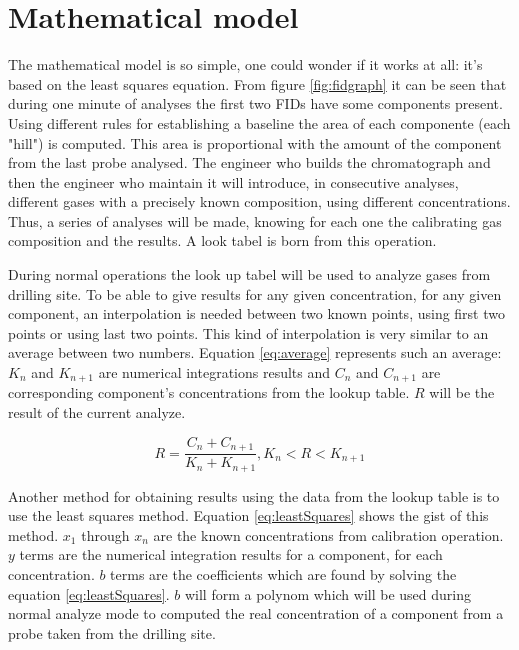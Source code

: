 \documentclass[conference]{IEEEtran}
\begin{document}
\section{Mathematical model}

    The mathematical model is so simple, one could wonder if it works at all: it's based on the least squares equation.
    From figure \ref{fig:fidgraph} it can be seen that during one minute of analyses the first two FIDs have some components present.
    Using different rules for establishing a baseline the area of each componente (each "hill") is computed. This area is 
    proportional with the amount of the component from the last probe analysed. The engineer who builds the chromatograph and then
    the engineer who maintain it will introduce, in consecutive analyses, different gases with a precisely known composition, using
    different concentrations. Thus, a series of analyses will be made, knowing for each one the calibrating gas composition and the
    results. A look tabel is born from this operation.

    During normal operations the look up tabel will be used to analyze gases from drilling site. To be able to give results for any
    given concentration, for any given component, an interpolation is needed between two known points, using first two points or
    using last two points. This kind of interpolation is very similar to an average between two numbers. Equation \ref{eq:average}
    represents such an average: \(K_n\) and \(K_{n+1}\) are numerical integrations results and  \(C_n\) and \(C_{n+1}\) are
    corresponding component's concentrations from the lookup table. \(R\) will be the result of the current analyze.    

    \begin{equation}
        R = \frac{C_n + C_{n+1}}{K_n + K_{n+1}}, K_{n} < R < K_{n+1}
        \label{eq:average}
    \end{equation}

    Another method for obtaining results using the data from the lookup table is to use the least squares method. Equation \ref{eq:leastSquares}
    shows the gist of this method. \(x_{1}\) through \(x_{n}\) are the known concentrations from calibration operation. \(y\) terms are
    the numerical integration results for a component, for each concentration. \(b\) terms are the coefficients which are found by 
    solving the equation \ref{eq:leastSquares}. \(b\) will form a polynom which will be used during normal analyze mode to computed
    the real concentration of a component from a probe taken from the drilling site.
\end{document}
